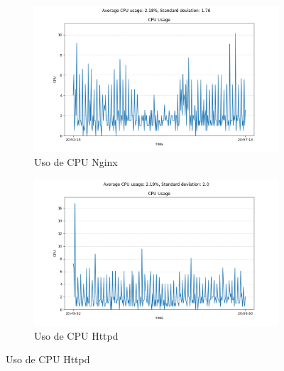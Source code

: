     \begin{figure}[H]
        \centering
        \begin{subfigure}[b]{0.45\textwidth}
            \centering
            \includegraphics[width=\textwidth]{./imagenes/nginx.csv.png}
            \caption{Uso de CPU Nginx}
            \label{fig:imagen1}
        \end{subfigure}
        \hfill
        \begin{subfigure}[b]{0.45\textwidth}
            \centering
            \includegraphics[width=\textwidth]{./imagenes/httpd.csv.png} 
            \caption{Uso de CPU Httpd}
            \label{fig:imagen2}
        \end{subfigure}
        
        \vspace{0.5cm} 
        

\end{figure}

